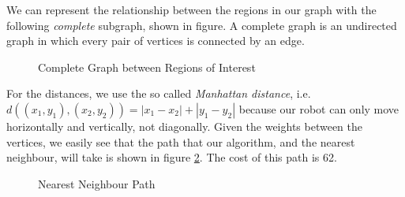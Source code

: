 We can represent the relationship between the regions in our graph with the following \textit{complete} subgraph, shown in figure. A complete graph is an undirected graph in which every pair of vertices is connected by an edge. 
\begin{figure}
\centering
{}
\caption{Complete Graph between Regions of Interest}
\label{fig:completeGraph}
\end{figure}

For the distances, we use the so called \textit{Manhattan distance}, i.e.\ $d((x_1,y_1),(x_2,y_2)) = |x_1 - x_2| +| y_1 - y_2|$ because our robot can only move horizontally and vertically, not diagonally. Given the weights between the vertices, we easily see that the path that our algorithm, and the nearest neighbour, will take is shown in figure \ref{fig:pathOnComplete}. The cost of this path is 62.

\begin{figure}
\centering
{}
\caption{Nearest Neighbour Path}
\label{fig:pathOnComplete}
\end{figure}

